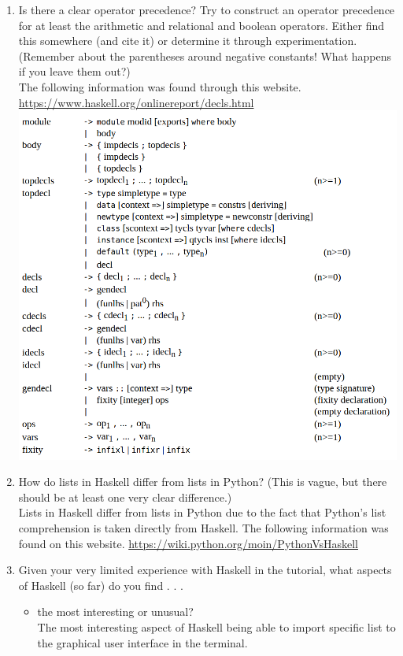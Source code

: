 \documentclass{article}
\begin{document}
\begin{enumerate}
\item Is there a clear operator precedence? Try to construct an operator precedence for at least the
arithmetic and relational and boolean operators. Either find this somewhere (and cite it) or
determine it through experimentation. (Remember about the parentheses around negative
constants! What happens if you leave them out?)
\\
The following information was found through this website.
\url{https://www.haskell.org/onlinereport/decls.html}
\\
\includegraphics[scale=0.45]{Screenshot}
\newpage
\item How do lists in Haskell differ from lists in Python? (This is vague, but there should be at
least one very clear difference.)
\\
Lists in Haskell differ from lists in Python due to the fact that Python's list comprehension is taken directly from Haskell. The following information was found on this website.
\url{https://wiki.python.org/moin/PythonVsHaskell}
\\
\item Given your very limited experience with Haskell in the tutorial, what aspects of Haskell (so
far) do you find . . .
\begin{itemize}
\item the most interesting or unusual?
\\
The most interesting aspect of Haskell being able to import specific list to the graphical user interface in the terminal. 

\end{itemize}
\end{enumerate}
\end{document}
